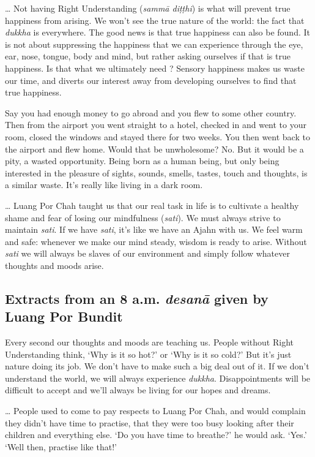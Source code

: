 \ldots{} Not having Right Understanding (\emph{sammā diṭṭhi}) is what
will prevent true happiness from arising. We won't see the true nature
of the world: the fact that \emph{dukkha} is everywhere. The good news
is that true happiness can also be found. It is not about suppressing
the happiness that we can experience through the eye, ear, nose, tongue, 
body and mind, but rather asking ourselves if that is true happiness. Is
that what we ultimately need ? Sensory happiness makes us waste our time, 
and diverts our interest away from developing ourselves to find that
true happiness. 

Say you had enough money to go abroad and you flew to some other
country. Then from the airport you went straight to a hotel, checked in
and went to your room, closed the windows and stayed there for two
weeks. You then went back to the airport and flew home. Would that be
unwholesome? No. But it would be a pity, a wasted opportunity. Being
born as a human being, but only being interested in the pleasure of
sights, sounds, smells, tastes, touch and thoughts, is a similar waste. 
It's really like living in a dark room. 

\ldots{} Luang Por Chah taught us that our real task in life is to
cultivate a healthy shame and fear of losing our mindfulness
(\emph{sati}). We must always strive to maintain \emph{sati}. If we have
\emph{sati}, it's like we have an Ajahn with us. We feel warm and safe:
whenever we make our mind steady, wisdom is ready to arise. Without
\emph{sati} we will always be slaves of our environment and simply
follow whatever thoughts and moods arise.

\subsection*{Extracts from an 8 a.m. \emph{desanā} given by Luang Por Bundit}

Every second our thoughts and moods are teaching us. People without
Right Understanding think, `Why is it so hot?' or `Why is it so cold?'
But it's just nature doing its job. We don't have to make such a big
deal out of it. If we don't understand the world, we will always
experience \emph{dukkha}. Disappointments will be difficult to accept
and we'll always be living for our hopes and dreams. 

\ldots{} People used to come to pay respects to Luang Por Chah, and
would complain they didn't have time to practise, that they were too
busy looking after their children and everything else. `Do you have time
to breathe?' he would ask. `Yes.' `Well then, practise like that!'

